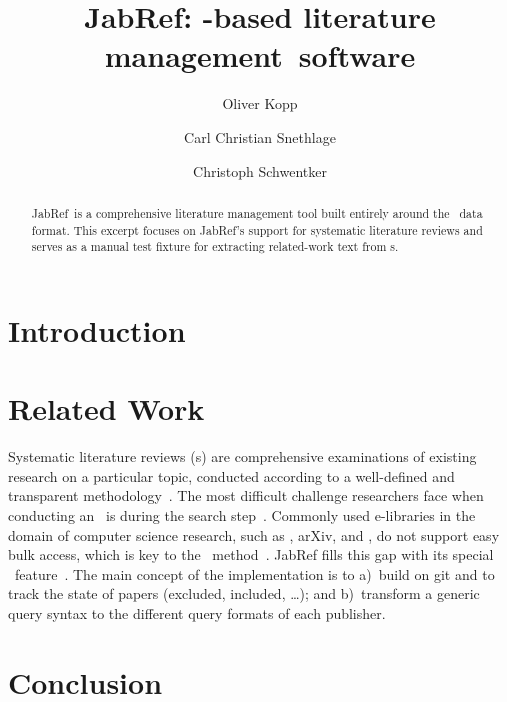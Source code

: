 \documentclass[final]{ltugboat}
\title{JabRef: \BibTeX-based literature management~software}
\author{Oliver Kopp}
\author{Carl Christian Snethlage}
\author{Christoph Schwentker}
\def\JR{Jab\-Ref\xspace}
\def\SLR{\acro{SLR}}
\begin{document}
\maketitle

\begin{abstract}
\JR\ is a comprehensive literature management tool built entirely around the \BibTeX\ data format.
This excerpt focuses on \JR's support for systematic literature reviews and serves as a
manual test fixture for extracting related-work text from \PDF{}s.
\end{abstract}

\section{Introduction}

\blindtext

\section{Related Work}

Systematic literature reviews (\SLR{}s) are comprehensive examinations of existing research on a particular topic, conducted according to a well-defined and transparent methodology~\cite{Kitchenham2007}.
The most difficult challenge researchers face when conducting an \SLR\ is during the search step~\cite{AlZubidy2018,Voigt2021}.
Commonly used e-libraries in the domain of computer science research, such as , arXiv, and , do not support easy bulk access, which is key to the \SLR\ method~\cite{AlZubidy2018}.
\JR fills this gap with its special \SLR\ feature~\cite{Voigt2021}.
The main concept of the implementation is to a)~build on git and \BibTeX{} to track the state of papers (excluded, included, \dots); and b)~transform a generic query syntax to the different query formats of each publisher.

\section{Conclusion}

\blindtext




\makesignature
\end{document}
